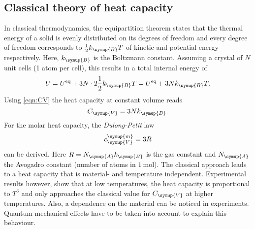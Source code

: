 \subsection{Classical theory of heat capacity}
\label{subsec:Classical}

In classical thermodynamics, the equipartition theorem states that the thermal energy of a solid is evenly distributed on its degrees of freedom and every degree of
freedom corresponds to $\frac{1}{2}k_{\symup{B}} T$ of kinetic and potential energy respectively. Here, $k_{\symup{B}} $ is the Boltzmann constant.
Assuming a crystal of $N$ unit cells (1 atom per cell), this results in a total internal energy of
\begin{equation*}
    U = U^\text{eq} + 3N \cdot 2 \frac{1}{2}k_{\symup{B}}  T = U^\text{eq} + 3Nk_{\symup{B}}  T.
\end{equation*}
Using \autoref{eqn:CV} the heat capacity at constant volume reads
\begin{equation*}
    C_{\symup{V}} = 3Nk_{\symup{B}} .
\end{equation*}
For the molar heat capacity, the \textit{Dulong-Petit} law
\begin{equation}
    c^{\symup{m}}_{\symup{V}} = 3 R
\end{equation}
can be derived. Here $R = N_{\symup{A}} k_{\symup{B}}$ is the gas constant and $N_{\symup{A}}$ the Avogadro constant (number of atoms in $\qty{1}{\mol}$).
The classical approach leads to a heat capacity that is material- and temperature independent. Experimental results however, show that at low temperatures, the heat capacity is
proportional to $T^3$ and only approaches the classical value for $C_{\symup{V}}$ at higher temperatures. Also, a dependence on the material can be noticed in experiments.
Quantum mechanical effects have to be taken into account to explain this behaviour.


